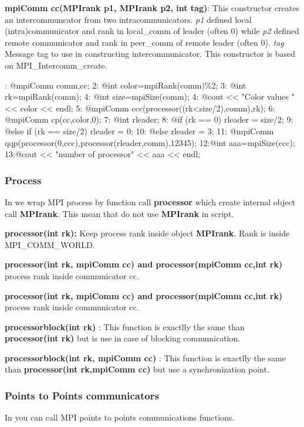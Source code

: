 \documentclass[a4paper,twoside,12pt]{book}
\begin{document}
\textbf{mpiComm cc(MPIrank p1, MPIrank p2, int tag)}: This constructor creates
an intercommuncator from two intracommunicators. \textit{p1} defined local
(intra)communicator and rank in local\_comm of leader (often 0) while
\textit{p2}  defined remote communicator and rank in peer\_comm of remote leader
(often 0). \textit{tag} Message tag to use in constructing intercommunicator.
This constructor is based on MPI\_Intercomm\_create.

\begin{example}\label{merge:comm}
: @mpiComm comm,cc;
2: @int color=mpiRank(comm)\%2;
3: @int rk=mpiRank(comm);
4: @int size=mpiSize(comm);
4: @cout << "Color values " << color << endl;
5: @mpiComm ccc(processor((rk<size/2),comm),rk);
6: @mpiComm cp(cc,color,0);
7: @int rleader;
8: @if (rk == 0) {  rleader = size/2; }
9: @else if (rk == size/2) { rleader = 0;}
10: @else { rleader = 3; }
11: @mpiComm qqp(processor(0,ccc),processor(rleader,comm),12345);
12:@int aaa=mpiSize(ccc);
13:@cout << "number of processor" << aaa << endl;
\eFF
\end{example}

\subsubsection{Process}
In \freefempp we wrap MPI process by function call \textbf{processor} which
create internal \freefempp object call \textbf{MPIrank}. This mean that do not
use \textbf{MPIrank} in \freefempp script.

\textbf{processor(int rk):} Keep process rank inside object \textbf{MPIrank}.
Rank is inside MPI\_COMM\_WORLD.

\textbf{processor(int rk, mpiComm cc) and processor(mpiComm cc,int rk) } process
rank inside communicator cc.

\textbf{processor(int rk, mpiComm cc) and processor(mpiComm cc,int rk) } process
rank inside communicator cc.

\textbf{processorblock(int rk) }: This function is exactlly the same than
\textbf{processor(int rk)} but is use in case of blocking communication.

\textbf{processorblock(int rk, mpiComm cc) }: This function is exactlly the same
than \textbf{processor(int rk,mpiComm cc)} but use a synchronization point.



\subsubsection{Points to Points communicators}
In \freefempp you can call MPI points to points communications functions.
\end{document}
